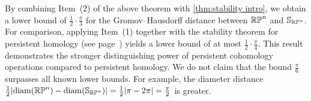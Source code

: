 By combining Item~(2) of the above theorem with \cref{thm:stability intro}, we obtain a lower bound of \(\frac{1}{2}\cdot\frac{\pi}{3}\) for the Gromov--Hausdorff distance between \(\mathbb{RP}^n\) and \(\mathbb{S}_{\mathbb{RP}^n}\).
For comparison, applying Item~(1) together with the stability theorem for persistent homology (see page~\pageref{thm:stability ph}) yields a lower bound of at most \(\frac{1}{2}\cdot\frac{\pi}{4}\).
This result demonstrates the stronger distinguishing power of persistent cohomology operations compared to persistent homology.
We do not claim that the bound \(\frac{\pi}{6}\) surpasses all known lower bounds.
For example, the diameter distance \(\frac{1}{2} \lvert \operatorname{diam}(\mathbb{RP}^n) - \operatorname{diam}(\mathbb{S}_{\mathbb{RP}^n}) \rvert = \frac{1}{2} \lvert \pi - 2\pi \rvert = \frac{\pi}{2}\) is greater.
